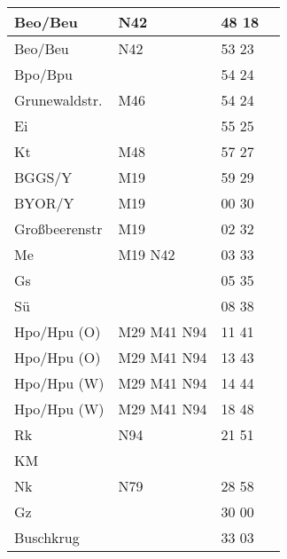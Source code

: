 \begin{tabular}{!{\color{schiefergrau}\vrule width 3pt}*{4}{l!{\color{schiefergrau}\vrule width 3pt}}}
Beo/Beu      & \nuneun{} \nbus{} N42                       & 48 18 &       \\
\hline
Beo/Beu      & \nuneun{} \nbus{} N42                       & 53 23 &       \\
Bpo/Bpu      &                                             & 54 24 &       \\
Grunewaldstr.& \mbus{} M46                                 & 54 24 &       \\
Ei           &                                             & 55 25 &       \\
Kt           & \mbus{} M48                                 & 57 27 &       \\
BGGS/Y       & \mbus{} M19                                 & 59 29 &       \\
BYOR/Y       & \mbus{} M19                                 & 00 30 &       \\
Großbeerenstr& \mbus{} M19                                 & 02 32 &       \\
Me           & \nusechs{} \mbus{} M19 \nbus{} N42          & 03 33 &       \\
Gs           &                                             & 05 35 &       \\
Sü           &                                             & 08 38 &       \\
Hpo/Hpu (O)  & \nuacht{} \mbus{} M29 M41 \nbus{} N94       & 11 41 &       \\
\hline
Hpo/Hpu (O)  & \nuacht{} \mbus{} M29 M41 \nbus{} N94       & 13 43 &       \\
Hpo/Hpu (W)  & \nuacht{} \mbus{} M29 M41 \nbus{} N94       & 14 44 &       \\
\hline
Hpo/Hpu (W)  & \nuacht{} \mbus{} M29 M41 \nbus{} N94       & 18 48 &       \\
Rk           & \nbus{} N94                                 & 21 51 &       \\
KM           &                                             &       &       \\
Nk           & \nbus{} N79                                 & 28 58 &       \\
Gz           &                                             & 30 00 &       \\
Buschkrug    &                                             & 33 03 &       \\

\end{tabular}
